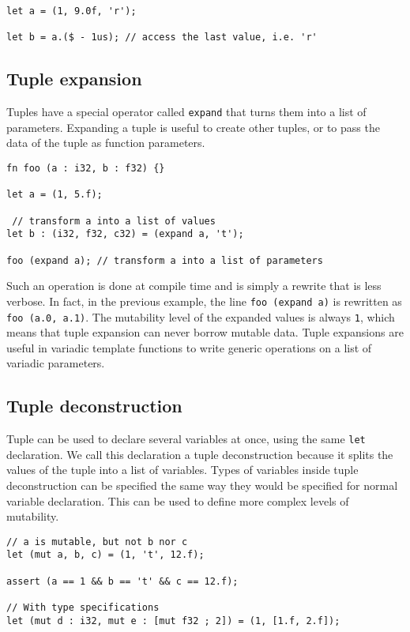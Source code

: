 \begin{lstlisting}[style=coloredverbatim]
let a = (1, 9.0f, 'r');

let b = a.($ - 1us); // access the last value, i.e. 'r'
\end{lstlisting}

\subsection {Tuple expansion}

Tuples have a special operator called \texttt{expand} that turns them into a
list of parameters. Expanding a tuple is useful to create other tuples, or to
pass the data of the tuple as function parameters.

\begin{lstlisting}[style=coloredverbatim]
fn foo (a : i32, b : f32) {}

let a = (1, 5.f);

 // transform a into a list of values
let b : (i32, f32, c32) = (expand a, 't');

foo (expand a); // transform a into a list of parameters
\end{lstlisting}

Such an operation is done at compile time and is simply a rewrite that is less
verbose. In fact, in the previous example, the line \texttt{foo (expand a)} is
rewritten as \texttt{foo (a.0, a.1)}. The mutability level of the expanded
values is always \texttt{1}, which means that tuple expansion can never borrow
mutable data. Tuple expansions are useful in variadic template functions to
write generic operations on a list of variadic parameters.

\subsection {Tuple deconstruction}

Tuple can be used to declare several variables at once, using the same
\texttt{let} declaration. We call this declaration a tuple deconstruction
because it splits the values of the tuple into a list of variables. Types of
variables inside tuple deconstruction can be specified the same way they would
be specified for normal variable declaration. This can be used to define more
complex levels of mutability.

\begin{lstlisting}[style=coloredverbatim]
  // a is mutable, but not b nor c
let (mut a, b, c) = (1, 't', 12.f);

assert (a == 1 && b == 't' && c == 12.f);

// With type specifications
let (mut d : i32, mut e : [mut f32 ; 2]) = (1, [1.f, 2.f]);
\end{lstlisting}


